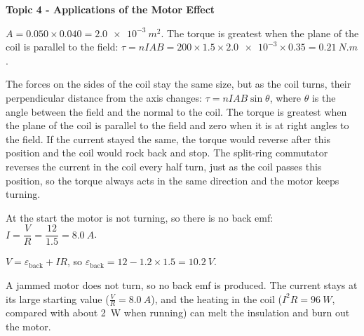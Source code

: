 \documentclass[12pt]{article}
\newcommand\anstopic[1]{\par\Needspace{8\baselineskip}\vspace{4mm}%
  \begin{center}{\headfont\bfseries\fontsize{14}{18}\selectfont #1\par}\end{center}\vspace{2pt}}
\begin{document}
\anstopic{Topic 4 - Applications of the Motor Effect}

\ansq
{}
\begin{crit}
\end{crit}
\sample
$A = 0.050 \times 0.040 = \qty{2.0e-3}{m^2}$. The torque is greatest when the plane of the coil is
parallel to the field: $\tau = nIAB = 200 \times 1.5 \times \num{2.0e-3} \times 0.35 = \qty{0.21}{N.m}$.
\begin{crit}
\end{crit}
\sample
The forces on the sides of the coil stay the same size, but as the coil turns, their perpendicular
distance from the axis changes: $\tau = nIAB\sin\theta$, where $\theta$ is the angle between the field
and the normal to the coil. The torque is greatest when the plane of the coil is parallel to the field
and zero when it is at right angles to the field. If the current stayed the same, the torque would
reverse after this position and the coil would rock back and stop. The split-ring commutator reverses the
current in the coil every half turn, just as the coil passes this position, so the torque always acts in
the same direction and the motor keeps turning.

\ansq
{}
\begin{crit}
\end{crit}
\sample
At the start the motor is not turning, so there is no back emf: $I = \dfrac{V}{R} = \dfrac{12}{1.5} = \qty{8.0}{A}$.
\begin{crit}
\end{crit}
\sample
$V = \varepsilon_\mathrm{back} + IR$, so $\varepsilon_\mathrm{back} = 12 - 1.2 \times 1.5 = \qty{10.2}{V}$.
\begin{crit}
\end{crit}
\sample
A jammed motor does not turn, so no back emf is produced. The current stays at its large starting value
($\frac{V}{R} = \qty{8.0}{A}$), and the heating in the coil ($I^2R = \qty{96}{W}$, compared with about
\qty{2}{W} when running) can melt the insulation and burn out the motor.
\end{document}
